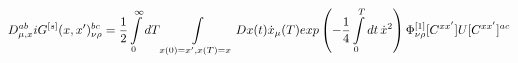 \begin{equation}
D^{ab}_{\mu,x}iG^{[s]}(x,x')^{bc}_{\nu\rho}={1\over 2}\int\limits_0^\infty dT
\int\limits_{x(0)=x',x(T)=x}Dx(t) \dot{x}_\mu(T)
exp\left(-{1\over 4}
\int\limits_0^Tdt\,\dot{x}^2\right)\Phi^{[1]}_{\nu\rho}[C^{xx'}]U[C^{xx'}]^{ac}
\end{equation}

